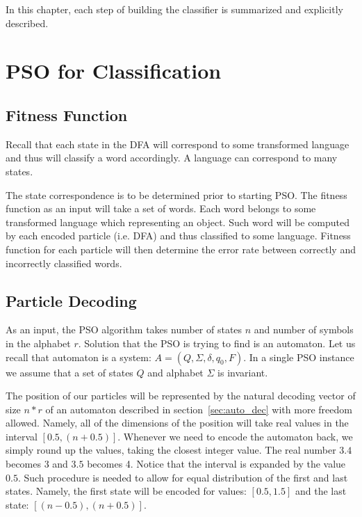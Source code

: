 \documentclass{mini}
\begin{document}
In this chapter, each step of building the classifier is summarized and explicitly described.

\section{PSO for Classification}

\subsection{Fitness Function}
Recall that each state in the DFA will correspond to some transformed language and thus will classify a word accordingly. A language can correspond to many states. 

The state correspondence is to be determined prior to starting PSO. The fitness function as an input will take a set of words. Each word belongs to some transformed language which representing an object. Such word will be computed by each encoded particle (i.e. DFA) and thus classified to some language. Fitness function for each particle will then determine the error rate between correctly and incorrectly classified words.

\subsection{Particle Decoding}

As an input, the PSO algorithm takes number of states $n$ and number of symbols in the alphabet $r$.
Solution that the PSO is trying to find is an automaton. Let us recall that automaton is a system: $A = (Q, \Sigma, \delta, q_0, F)$. In a single PSO instance we assume that a set of states $Q$ and alphabet $\Sigma$ is invariant. 

The position of our particles will be represented by the natural decoding vector of size $n*r$ of an automaton described in section~\ref{sec:auto_dec} with more freedom allowed. Namely, all of the dimensions of the position will take real values in the interval $[0.5, (n+0.5)]$. Whenever we need to encode the automaton back, we simply round up the values, taking the closest integer value. The real number $3.4$ becomes $3$ and $3.5$ becomes 4. Notice that the interval is expanded by the value $0.5$. Such procedure is needed to allow for equal distribution of the first and last states. Namely, the first state will be encoded for values: $[0.5, 1.5]$ and the last state: $[(n-0.5), (n+0.5)]$.
\end{document}
